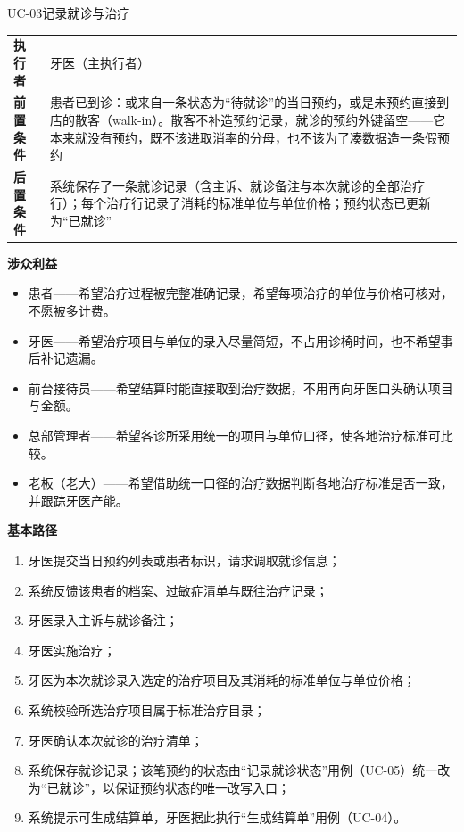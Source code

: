 \documentclass[11pt,a4paper]{ctexart}
\begin{document}
\begin{ucbox}{UC-03\quad 记录就诊与治疗}
\small
\begin{tabularx}{\linewidth}{@{}L{2.2cm}X@{}}
\toprule
\textbf{\textcolor{adcblue!92}{执行者}} & 牙医（主执行者） \\
\textbf{前置条件} & 患者已到诊：或来自一条状态为“待就诊”的当日预约，或是未预约直接到店的散客（walk-in）。散客不补造预约记录，就诊的预约外键留空——它本来就没有预约，既不该进取消率的分母，也不该为了凑数据造一条假预约 \\
\textbf{后置条件} & 系统保存了一条就诊记录（含主诉、就诊备注与本次就诊的全部治疗行）；每个治疗行记录了消耗的标准单位与单位价格；预约状态已更新为“已就诊” \\
\bottomrule
\end{tabularx}

\vspace{4pt}
\textbf{涉众利益}
\begin{itemize}[leftmargin=1.4em,topsep=2pt,itemsep=1pt]
  \item 患者——希望治疗过程被完整准确记录，希望每项治疗的单位与价格可核对，不愿被多计费。
  \item 牙医——希望治疗项目与单位的录入尽量简短，不占用诊椅时间，也不希望事后补记遗漏。
  \item 前台接待员——希望结算时能直接取到治疗数据，不用再向牙医口头确认项目与金额。
  \item 总部管理者——希望各诊所采用统一的项目与单位口径，使各地治疗标准可比较。
  \item 老板（老大）——希望借助统一口径的治疗数据判断各地治疗标准是否一致，并跟踪牙医产能。
\end{itemize}

\vspace{2pt}
\textbf{基本路径}
\begin{enumerate}[leftmargin=1.9em,topsep=2pt,itemsep=1pt]
  \item 牙医提交当日预约列表或患者标识，请求调取就诊信息；
  \item 系统反馈该患者的档案、过敏症清单与既往治疗记录；
  \item 牙医录入主诉与就诊备注；
  \item 牙医实施治疗；
  \item 牙医为本次就诊录入选定的治疗项目及其消耗的标准单位与单位价格；
  \item 系统校验所选治疗项目属于标准治疗目录；
  \item 牙医确认本次就诊的治疗清单；
  \item 系统保存就诊记录；该笔预约的状态由“记录就诊状态”用例（UC-05）统一改为“已就诊”，以保证预约状态的唯一改写入口；
  \item 系统提示可生成结算单，牙医据此执行“生成结算单”用例（UC-04）。
\end{enumerate}


\end{ucbox}
\end{document}

